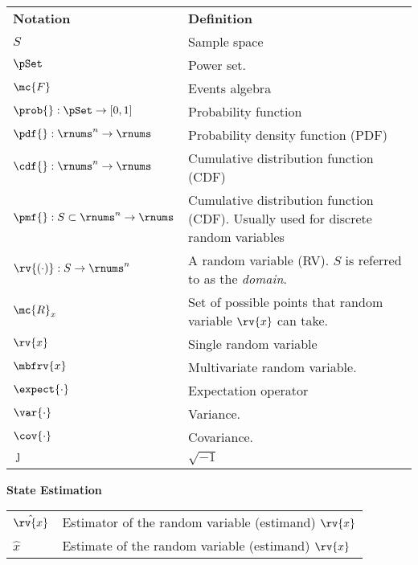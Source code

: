 \begin{table}[h]
    \centering
    \begin{tabular}{p{}p{}}
        \textbf{Notation} & \textbf{Definition}\\[5pt]
        $S$ & Sample space\\
        $\pSet$ & Power set. \\
        $\mc{F}$ & Events algebra\\
        $\prob{}:\pSet\to[0,1]$ & Probability function\\
        $\pdf{}:\rnums^{n}\to\rnums$ & Probability density function (PDF)\\
        $\cdf{}:\rnums^{n}\to\rnums$ & Cumulative distribution function (CDF)\\
        $\pmf{}:S\subset\rnums^{n}\to\rnums$ & Cumulative distribution function (CDF). Usually used for discrete random variables\\
        $\rv{(\cdot)}: S\to\rnums^{n}$& A random variable (RV). $S$ is referred to as the \emph{domain}. \\
        $\mc{R}_{x}$& Set of possible points that random variable $\rv{x}$ can take. \\
        $\rv{x}$ & Single random variable\\
        $\mbfrv{x}$ & Multivariate random variable.   \\
        $\expect{\cdot}$ & Expectation operator\\
        $\var{\cdot}$ & Variance.      \\
        $\cov{\cdot}$ & Covariance.      \\
        $\jmath$ & $\sqrt{-1}$             
    \end{tabular}
\end{table}

{\centering
\textbf{State Estimation}
}
\begin{table}[H]
    \centering
    \begin{tabular}{p{}p{}}
        $\hat{\rv{x}}$ & Estimator of the random variable (estimand) $\rv{x}$\\        
        $\hat{x}$ & Estimate of the random variable (estimand) $\rv{x}$
    \end{tabular}
\end{table}


